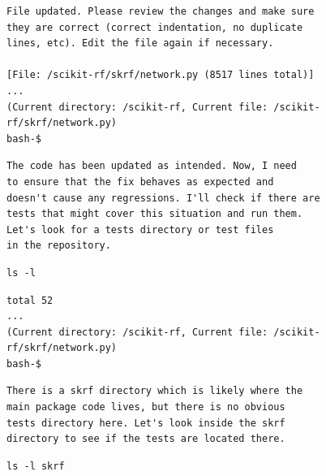 \documentclass[dandb]{article}
\begin{document}
\begin{flushright}
  \begin{envmessage}
  \begin{lstlisting}[backgroundcolor=\color{green!5!white},frame=none]
File updated. Please review the changes and make sure
they are correct (correct indentation, no duplicate
lines, etc). Edit the file again if necessary.

[File: /scikit-rf/skrf/network.py (8517 lines total)]
...
(Current directory: /scikit-rf, Current file: /scikit-rf/skrf/network.py)
bash-$
  \end{lstlisting}
  \end{envmessage}
\end{flushright}

\begin{agentmessage}
\begin{lstlisting}[backgroundcolor=\color{blue!5!white},frame=none]
The code has been updated as intended. Now, I need
to ensure that the fix behaves as expected and
doesn't cause any regressions. I'll check if there are
tests that might cover this situation and run them.
Let's look for a tests directory or test files
in the repository.
\end{lstlisting}

\begin{lstlisting}[backgroundcolor=\color{white!10}]
ls -l
\end{lstlisting}
\end{agentmessage}

\begin{flushright}
  \begin{envmessage}
  \begin{lstlisting}[backgroundcolor=\color{green!5!white},frame=none]
total 52
...
(Current directory: /scikit-rf, Current file: /scikit-rf/skrf/network.py)
bash-$
  \end{lstlisting}
  \end{envmessage}
\end{flushright}

\begin{agentmessage}
\begin{lstlisting}[backgroundcolor=\color{blue!5!white},frame=none]
There is a skrf directory which is likely where the
main package code lives, but there is no obvious
tests directory here. Let's look inside the skrf
directory to see if the tests are located there.
\end{lstlisting}

\begin{lstlisting}[backgroundcolor=\color{white!10}]
ls -l skrf
\end{lstlisting}
\end{agentmessage}
\end{document}
